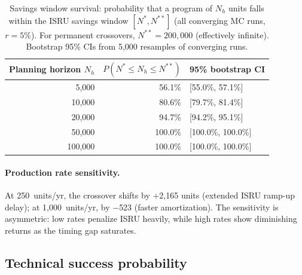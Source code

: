 \documentclass[preprint,12pt]{elsarticle}
\begin{document}
\begin{table}[htbp]
\centering
\caption{Savings window survival: probability that a program of $N_h$ units falls within the ISRU savings window $[N^*, N^{**}]$ (all converging MC runs, $r = 5\%$). For permanent crossovers, $N^{**} = 200{,}000$ (effectively infinite). Bootstrap 95\% CIs from 5{,}000 resamples of converging runs.}
\label{tab:savings_survival}
\small
\begin{tabular}{@{}rrl@{}}
\toprule
Planning horizon $N_h$ & $P(N^* \leq N_h \leq N^{**})$ & 95\% bootstrap CI \\
\midrule
5{,}000   & 56.1\% & [55.0\%, 57.1\%] \\
10{,}000  & 80.6\% & [79.7\%, 81.4\%] \\
20{,}000  & 94.7\% & [94.2\%, 95.1\%] \\
50{,}000  & 100.0\% & [100.0\%, 100.0\%] \\
100{,}000 & 100.0\% & [100.0\%, 100.0\%] \\
\bottomrule
\end{tabular}
\end{table}

\paragraph{Production rate sensitivity.} At 250~units/yr, the crossover shifts by $+$2{,}165 units (extended ISRU ramp-up delay); at 1{,}000~units/yr, by $-$523 (faster amortization). The sensitivity is asymmetric: low rates penalize ISRU heavily, while high rates show diminishing returns as the timing gap saturates.

\subsection{Technical success probability}
\label{sec:success_probability}
\end{document}
